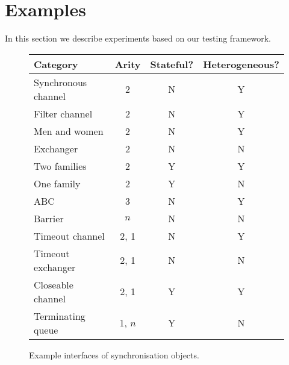 \section{Examples}

In this section we describe experiments based on our testing framework. 


\begin{figure}
\begin{center}
\begin{tabular}{lccc}
Category            & Arity & Stateful? & Heterogeneous? \\ \hline
Synchronous channel & 2     & N         & Y \\
Filter channel      & 2     & N         & Y \\
Men and women        & 2     & N         & Y \\
Exchanger           & 2     & N         & N \\
Two families        & 2     & Y         & Y \\
One family          & 2     & Y         & N \\
ABC                 & 3     & N         & Y \\
Barrier             & $n$   & N         & N \\
Timeout channel     & 2, 1  & N         & Y \\
Timeout exchanger   & 2, 1  & N         & N \\
Closeable channel   & 2, 1  & Y         & Y \\
Terminating queue   & 1, $n$ & Y        & N  
\end{tabular}
\end{center}
\caption{Example interfaces of synchronisation objects.  \label{fig:examples}}
\end{figure}




